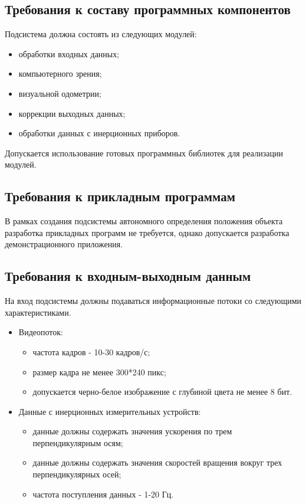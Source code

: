 \documentclass
[a4paper,14pt,russian]{article}
\begin{document}
\subsection{Требования к составу программных компонентов}
Подсистема должна состоять из следующих  модулей:
\begin{itemize}
\item обработки входных данных;
\item компьютерного зрения;
\item визуальной одометрии;
\item коррекции выходных данных;
\item обработки данных с инерционных приборов.
\end{itemize}
Допускается использование готовых программных библиотек для реализации модулей. 

\subsection{Требования к прикладным программам} 
В рамках создания подсистемы автономного определения положения объекта разработка прикладных программ не требуется, однако допускается разработка демонстрационного приложения.

\subsection{Требования к входным-выходным данным}
На вход подсистемы должны подаваться информационные потоки со следующими характеристиками.
\begin{itemize}
\item Видеопоток:
	\begin{itemize}
	\item частота кадров - 10-30 кадров/с;
	\item размер кадра не менее 300*240 пикс;
	\item допускается черно-белое изображение с глубиной цвета не менее 8 бит.
	\end{itemize}
\item Данные с инерционных измерительных устройств:
	\begin{itemize}
	\item данные должны содержать значения ускорения по трем перпендикулярным осям;
	\item данные должны содержать значения скоростей вращения вокруг трех перпендикулярных осей;
	\item частота поступления данных - 1-20 Гц. 
	\end{itemize}
\end{itemize}
\end{document}
